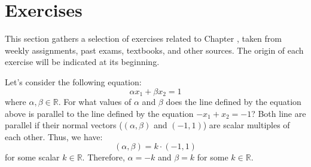 \section{Exercises}
This section gathers a selection of exercises related to Chapter \thechapter, taken from weekly assignments, past exams, textbooks, and other sources. The origin of each exercise will be indicated at its beginning.
\begin{exercise}
    Let's consider the following equation:
    \[
        \alpha x_1 + \beta x_2 = 1
    \]
    where $\alpha, \beta \in \mathbb{R}$. For what values of $\alpha$ and $\beta$ does the line defined by the equation above is parallel to the line defined by the equation $-x_1 + x_2 = -1$?
    \Answer
    Both line are parallel if their normal vectors ($(\alpha, \beta)$ and $(-1, 1)$) are scalar multiples of each other. Thus, we have:
    \[
        (\alpha, \beta) = k \cdot (-1, 1)
    \]
    for some scalar $k \in \mathbb{R}$. Therefore, $\alpha = -k$ and $\beta = k$ for some $k \in \mathbb{R}$.
\end{exercise}

